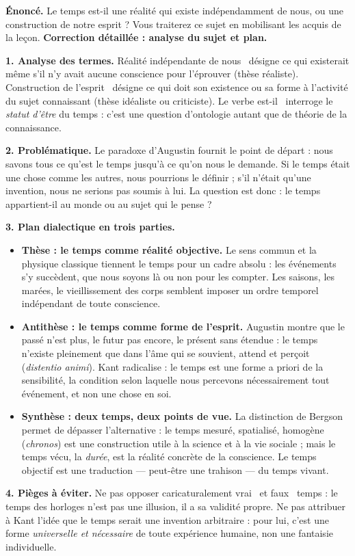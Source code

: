 \documentclass[11pt]{article}
\begin{document}
\begin{exoresolu}
\textbf{Énoncé.} Le temps est-il une réalité qui existe indépendamment de nous, ou une construction de notre esprit ? Vous traiterez ce sujet en mobilisant les acquis de la leçon.
\tcblower
\textbf{Correction détaillée : analyse du sujet et plan.}

\textbf{1. Analyse des termes.} \guillemotleft Réalité indépendante de nous \guillemotright\ désigne ce qui existerait même s'il n'y avait aucune conscience pour l'éprouver (thèse réaliste). \guillemotleft Construction de l'esprit \guillemotright\ désigne ce qui doit son existence ou sa forme à l'activité du sujet connaissant (thèse idéaliste ou criticiste). Le verbe \guillemotleft est-il \guillemotright\ interroge le \emph{statut d'être} du temps : c'est une question d'ontologie autant que de théorie de la connaissance.

\textbf{2. Problématique.} Le paradoxe d'Augustin fournit le point de départ : nous savons tous ce qu'est le temps jusqu'à ce qu'on nous le demande. Si le temps était une chose comme les autres, nous pourrions le définir ; s'il n'était qu'une invention, nous ne serions pas soumis à lui. La question est donc : le temps appartient-il au monde ou au sujet qui le pense ?

\textbf{3. Plan dialectique en trois parties.}
\begin{itemize}
\item \textbf{Thèse : le temps comme réalité objective.} Le sens commun et la physique classique tiennent le temps pour un cadre absolu : les événements s'y succèdent, que nous soyons là ou non pour les compter. Les saisons, les marées, le vieillissement des corps semblent imposer un ordre temporel indépendant de toute conscience.
\item \textbf{Antithèse : le temps comme forme de l'esprit.} Augustin montre que le passé n'est plus, le futur pas encore, le présent sans étendue : le temps n'existe pleinement que dans l'âme qui se souvient, attend et perçoit (\emph{distentio animi}). Kant radicalise : le temps est une forme a priori de la sensibilité, la condition selon laquelle nous percevons nécessairement tout événement, et non une chose en soi.
\item \textbf{Synthèse : deux temps, deux points de vue.} La distinction de Bergson permet de dépasser l'alternative : le temps mesuré, spatialisé, homogène (\emph{chronos}) est une construction utile à la science et à la vie sociale ; mais le temps vécu, la \emph{durée}, est la réalité concrète de la conscience. Le temps objectif est une traduction — peut-être une trahison — du temps vivant.
\end{itemize}

\textbf{4. Pièges à éviter.} Ne pas opposer caricaturalement \guillemotleft vrai \guillemotright\ et \guillemotleft faux \guillemotright\ temps : le temps des horloges n'est pas une illusion, il a sa validité propre. Ne pas attribuer à Kant l'idée que le temps serait une invention arbitraire : pour lui, c'est une forme \emph{universelle et nécessaire} de toute expérience humaine, non une fantaisie individuelle.
\end{exoresolu}
\end{document}
